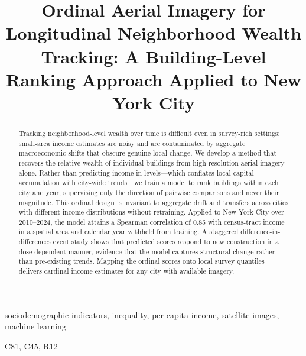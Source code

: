 \documentclass[conference]{IEEEtran}
\renewcommand\IEEEkeywordsname{Palabras clave}
\begin{document}

\title{\huge \textbf{Ordinal Aerial Imagery for Longitudinal Neighborhood Wealth Tracking}: A Building-Level Ranking Approach Applied to New York City
} 

\author{
}

\maketitle

\begin{abstract}
Tracking neighborhood-level wealth over time is difficult even in survey-rich settings: small-area income estimates are noisy and are contaminated by aggregate macroeconomic shifts that obscure genuine local change. We develop a method that recovers the relative wealth of individual buildings from high-resolution aerial imagery alone. Rather than predicting income in levels—which conflates local capital accumulation with city-wide trends—we train a model to rank buildings within each city and year, supervising only the direction of pairwise comparisons and never their magnitude. This ordinal design is invariant to aggregate drift and transfers across cities with different income distributions without retraining. Applied to New York City over 2010–2024, the model attains a Spearman correlation of 0.85 with census-tract income in a spatial area and calendar year withheld from training. A staggered difference-in-differences event study shows that predicted scores respond to new construction in a dose-dependent manner, evidence that the model captures structural change rather than pre-existing trends. Mapping the ordinal scores onto local survey quantiles delivers cardinal income estimates for any city with available imagery.
\end{abstract}

\renewcommand\IEEEkeywordsname{Keywords}
\begin{IEEEkeywords}
sociodemographic indicators, inequality, per capita income, satellite images, machine learning
\end{IEEEkeywords}
\renewcommand\IEEEkeywordsname{JEL Codes}
\begin{IEEEkeywords}
C81, C45, R12
\end{IEEEkeywords}
\end{document}
